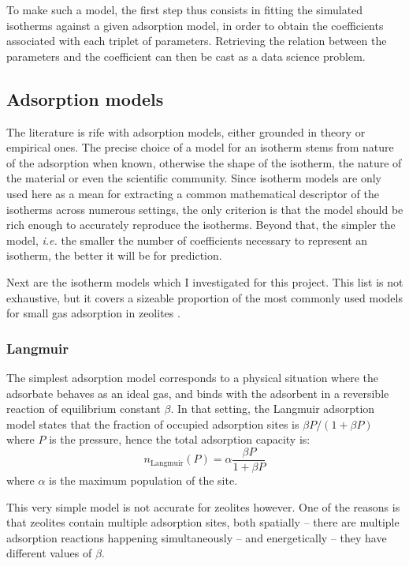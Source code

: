 \documentclass[main.tex]{subfiles}
\begin{document}
To make such a model, the first step thus consists in fitting the simulated isotherms against a given adsorption model, in order to obtain the coefficients associated with each triplet of parameters. Retrieving the relation between the parameters and the coefficient can then be cast as a data science problem.

\subsection{Adsorption models}

The literature is rife with adsorption models, either grounded in theory or empirical ones. The precise choice of a model for an isotherm stems from nature of the adsorption when known, otherwise the shape of the isotherm, the nature of the material or even the scientific community. Since isotherm models are only used here as a mean for extracting a common mathematical descriptor of the isotherms across numerous settings, the only criterion is that the model should be rich enough to accurately reproduce the isotherms. Beyond that, the simpler the model, \textit{i.e.} the smaller the number of coefficients necessary to represent an isotherm, the better it will be for prediction.

Next are the isotherm models which I investigated for this project. This list is not exhaustive, but it covers a sizeable proportion of the most commonly used models for small gas adsorption in zeolites \autocite{AyaweiIsothermModels}.

\subsubsection{Langmuir}

The simplest adsorption model corresponds to a physical situation where the adsorbate behaves as an ideal gas, and binds with the adsorbent in a reversible reaction of equilibrium constant $\beta$. In that setting, the Langmuir adsorption model states that the fraction of occupied adsorption sites is $\beta P/(1+\beta P)$ where $P$ is the pressure, hence the total adsorption capacity is:
\[n_\text{Langmuir}(P) = \alpha\frac{\beta P}{1+\beta P}\]
where $\alpha$ is the maximum population of the site.

This very simple model is not accurate for zeolites however. One of the reasons is that zeolites contain multiple adsorption sites, both spatially -- there are multiple adsorption reactions happening simultaneously -- and energetically -- they have different values of $\beta$.
\end{document}
